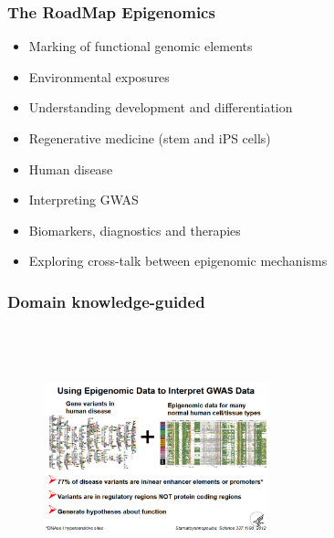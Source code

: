 \documentclass[10pt,xcolor=dvipsnames]{beamer}\usepackage[]{graphicx}\usepackage[]{color}
\begin{document}
\begin{frame}\frametitle{The RoadMap Epigenomics}

\begin{itemize}
 \item \textcolor{OliveGreen}{Marking of functional genomic elements}
 \item \textcolor{OliveGreen}{Environmental exposures}
 \item Understanding development and differentiation
 \item Regenerative medicine (stem and iPS cells)
 \item Human disease
 \item \textcolor{OliveGreen}{Interpreting GWAS}
 \item Biomarkers, diagnostics and therapies
 \item Exploring cross-talk between epigenomic mechanisms
\end{itemize}

\end{frame}


\begin{frame}\frametitle{Domain knowledge-guided}

\begin{figure}
  \includegraphics[height=7.5cm, width=6.5cm]{figures/roadmap_utility.jpg}
\end{figure}

\end{frame}
\end{document}
